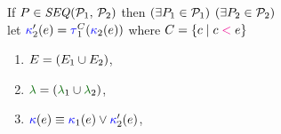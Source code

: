 \begin{figure}
  \noindent
  If $\aPS \in \sSEMI{\aPSS_1}{\aPSS_2}$ then $(\exists P_1\in\mathcal{P}_1)$ $(\exists P_2\in\mathcal{P}_2)$\\
  let
  $\labelingForm'_2(\aEv)=\aTr[1]{\Cdown{\aEv}}{\labelingForm_2(\aEv})$ where
  $C=\{ c \mid c \mathrel{{\color{magenta}<}} e \}$
  \begin{multicols}{2}
    \begin{enumerate}[topsep=0pt,label=(\textsc{s}\arabic*),ref=\textsc{s}\arabic*]
    \item \label{seq-E}
      $E = (E_1\cup E_2)$,
    \item \label{seq-lambda}
      ${\labeling}=\PBR{{\labeling_1}\cup {\labeling_2}}$, 
    \item \label{seq-kappa}
      ${\color{blue}\kappa}(e) \mathrel{\equiv} {{\color{blue}\kappa}_1(e)\lor{\color{blue}\kappa}'_2(e)}$,

\end{enumerate}
\end{multicols}
\end{figure}
